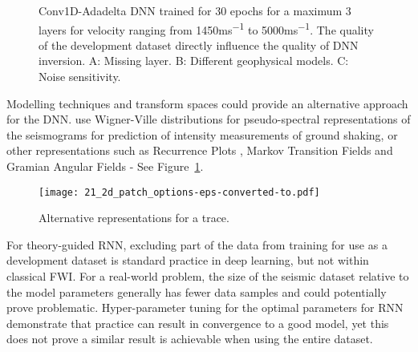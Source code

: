 \clearpage
\begin{figure}[ht!]
    \centering
	\caption[Development dataset directly influences the quality of inversion.]{Conv1D-Adadelta DNN trained for 30 epochs for a maximum 3 layers for velocity ranging from 1450\si{ms^{-1}} to 5000\si{ms^{-1}}. The quality of the development dataset directly influence the quality of DNN inversion. A: Missing layer. B: Different geophysical models. C: Noise sensitivity. }
\end{figure}

\clearpage
Modelling techniques and transform spaces could provide an alternative approach for the DNN. \cite{Jozinovic2020} use Wigner-Ville distributions for pseudo-spectral representations of the seismograms for prediction of intensity measurements of ground shaking, or other representations such as Recurrence Plots \citep{Kamphorst1987}, Markov Transition Fields \citep{Wang2015} and Gramian Angular Fields \citep{Wang2015} - See Figure~\ref{fig:alt_representations_trace}.

\begin{figure}[ht!]
    \centering
    \texttt{[image: 21\_2d\_patch\_options-eps-converted-to.pdf]}
    \caption[Alternative representations for a trace.]{Alternative representations for a trace.}
    \label{fig:alt_representations_trace}
\end{figure}

For theory-guided RNN, excluding part of the data from training for use as a development dataset is standard practice in deep learning, but not within classical FWI. For a real-world problem, the size of the seismic dataset relative to the model parameters generally has fewer data samples and could potentially prove problematic. Hyper-parameter tuning for the optimal parameters for RNN demonstrate that practice can result in convergence to a good model, yet this does not prove a similar result is achievable when using the entire dataset. 

